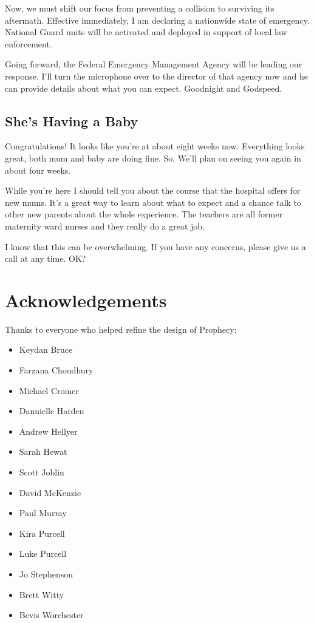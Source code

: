\documentclass[12pt, a5paper, parskip=half-]{scrartcl}
\begin{document}
Now, we must shift our focus from preventing a collision to surviving its aftermath.
Effective immediately, I am declaring a nationwide state of emergency.  National Guard units will be activated and deployed in support of local law enforcement. 

Going forward, the Federal Emergency Management Agency will be leading our response.
I'll turn the microphone over to the director of that agency now and he can provide details about what you can expect.
Goodnight and Godspeed.


\subsection*{She's Having a Baby}
Congratulations! It looks like you're at about eight weeks now.
Everything looks great, both mum and baby are doing fine. 
So, We'll plan on seeing you again in about four weeks.

While you're here I should tell you about the course that the hospital offers for new mums.
It's a great way to learn about what to expect and a chance talk to other new parents about the whole experience. 
The teachers are all former maternity ward nurses and they really do a great job.

I know that this can be overwhelming. If you have any concerns, please give us a call at any time.  OK?

\newpage

\section*{Acknowledgements}
Thanks to everyone who helped refine the design of Prophecy:
\begin{multicols}{2}
\begin{itemize}
  \item Keydan Bruce
  \item Farzana Choudhury
  \item Michael Cromer
  \item Dannielle Harden
  \item Andrew Hellyer
  \item Sarah Hewat
  \item Scott Joblin
  \item David McKenzie
  \item Paul Murray
  \item Kira Purcell
  \item Luke Purcell
  \item Jo Stephenson
  \item Brett Witty
  \item Bevis Worchester
  
\end{itemize}
\end{multicols}
\end{document}
